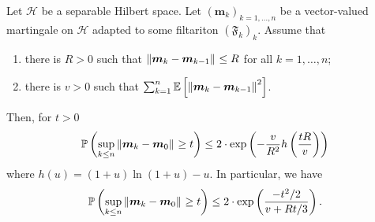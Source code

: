 \begin{lem}
  \label{vectorbernstein}
  Let \( \mathcal{H} \) be a separable Hilbert space. Let \( (\bm{m}_k)_{k=1,\dots,n} \) be a vector-valued martingale on \( \mathcal{H} \) adapted to some filtariton \( \left(\mathfrak{F}_k\right)_k \). Assume that 
  \begin{enumerate}[1)]
    \item there is \( R>0 \) such that \( \norm{\bm{m}_k-\bm{m}_{k-1}}_{} \leq R \) for all \( k=1, \dots, n \);
    \item there is \( v>0 \) such that \( \sum_{k=1}^{n} \mathbb{E}\left[\norm{\bm{m}_k- \bm{m}_{k-1}}^2\right] \).
  \end{enumerate}
  Then, for \( t >0 \)
  \[ \mathbb{P}\left(\sup_{k\leq n} \norm{\bm{m}_k-\bm{m}_0}_{} \geq t\right)  \leq 2 \cdot \operatorname{exp}\left(-\frac{v}{R^2} h\left(\frac{tR}{v}\right)\right)\]
  where \( h(u)=(1+u)\operatorname{ln}\left(1+u\right)-u \). In particular, we have 
  \[ \mathbb{P}\left(\sup_{k\leq n} \norm{\bm{m}_k-\bm{m}_0}_{} \geq t\right)  \leq 2 \cdot \operatorname{exp}\left(\frac{-t^2/2}{v+Rt/3}\right).  \]
\end{lem}



